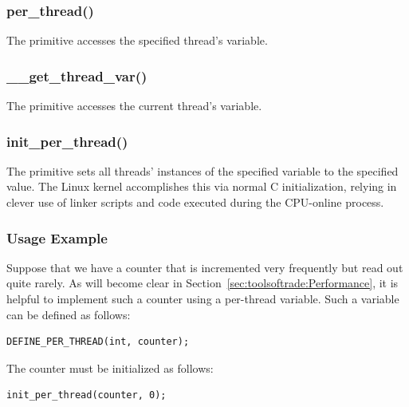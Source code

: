 \subsubsection{per\_thread()}

The  primitive accesses the specified thread's variable.

\subsubsection{\_\_get\_thread\_var()}

The  primitive accesses the current thread's variable.

\subsubsection{init\_per\_thread()}

The  primitive sets all threads' instances of
the specified variable to the specified value.
The Linux kernel accomplishes this via normal C initialization,
relying in clever use of linker scripts and code executed during
the CPU-online process.

\subsubsection{Usage Example}

Suppose that we have a counter that is incremented very frequently
but read out quite rarely.
As will become clear in
Section~\ref{sec:toolsoftrade:Performance},
it is helpful to implement such a counter using a per-thread variable.
Such a variable can be defined as follows:

\vspace{5pt}
\begin{minipage}[t]{\columnwidth}
\small
\begin{verbatim}
DEFINE_PER_THREAD(int, counter);
\end{verbatim}
\end{minipage}
\vspace{5pt}

The counter must be initialized as follows:

\vspace{5pt}
\begin{minipage}[t]{\columnwidth}
\small
\begin{verbatim}
init_per_thread(counter, 0);
\end{verbatim}
\end{minipage}
\vspace{5pt}

